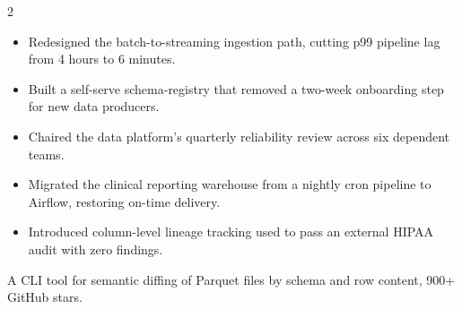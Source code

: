 \documentclass[10pt,a4paper,ragged2e,withhyper]{altacv}
\begin{document}


\makecvheader

\begin{paracol}{2}


\begin{itemize}
\item Redesigned the batch-to-streaming ingestion path, cutting p99 pipeline lag from 4 hours to 6 minutes.
\item Built a self-serve schema-registry that removed a two-week onboarding step for new data producers.
\item Chaired the data platform's quarterly reliability review across six dependent teams.
\end{itemize}

\divider

\begin{itemize}
\item Migrated the clinical reporting warehouse from a nightly cron pipeline to Airflow, restoring on-time delivery.
\item Introduced column-level lineage tracking used to pass an external HIPAA audit with zero findings.
\end{itemize}


A CLI tool for semantic diffing of Parquet files by schema and row content, 900+ GitHub stars.


\\

\switchcolumn





\divider
{}
\divider
{}
\divider
{}


\divider
{}
\divider
{}

\end{paracol}
\end{document}
